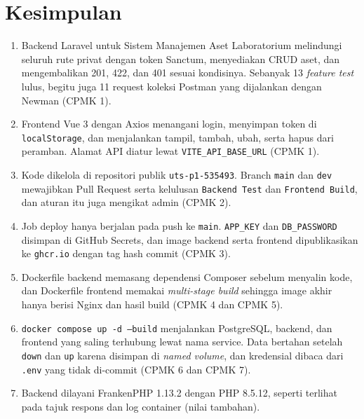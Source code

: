 \documentclass[a4paper,oneside,12pt]{report}
\begin{document}
\clearpage

\chapter{Kesimpulan}
\begin{enumerate}
    \item Backend Laravel untuk Sistem Manajemen Aset Laboratorium melindungi seluruh rute privat dengan token Sanctum, menyediakan CRUD aset, dan mengembalikan 201, 422, dan 401 sesuai kondisinya. Sebanyak 13 \textit{feature test} lulus, begitu juga 11 request koleksi Postman yang dijalankan dengan Newman (CPMK 1).
    \item Frontend Vue 3 dengan Axios menangani login, menyimpan token di \texttt{localStorage}, dan menjalankan tampil, tambah, ubah, serta hapus dari peramban. Alamat API diatur lewat \texttt{VITE\_API\_BASE\_URL} (CPMK 1).
    \item Kode dikelola di repositori publik \texttt{uts-p1-535493}. Branch \texttt{main} dan \texttt{dev} mewajibkan Pull Request serta kelulusan \texttt{Backend Test} dan \texttt{Frontend Build}, dan aturan itu juga mengikat admin (CPMK 2).
    \item Job deploy hanya berjalan pada push ke \texttt{main}. \texttt{APP\_KEY} dan \texttt{DB\_PASSWORD} disimpan di GitHub Secrets, dan image backend serta frontend dipublikasikan ke \texttt{ghcr.io} dengan tag hash commit (CPMK 3).
    \item Dockerfile backend memasang dependensi Composer sebelum menyalin kode, dan Dockerfile frontend memakai \textit{multi-stage build} sehingga image akhir hanya berisi Nginx dan hasil build (CPMK 4 dan CPMK 5).
    \item \texttt{docker compose up -d --build} menjalankan PostgreSQL, backend, dan frontend yang saling terhubung lewat nama service. Data bertahan setelah \texttt{down} dan \texttt{up} karena disimpan di \textit{named volume}, dan kredensial dibaca dari \texttt{.env} yang tidak di-commit (CPMK 6 dan CPMK 7).
    \item Backend dilayani FrankenPHP 1.13.2 dengan PHP 8.5.12, seperti terlihat pada tajuk respons dan log container (nilai tambahan).
\end{enumerate}

\clearpage
\end{document}
